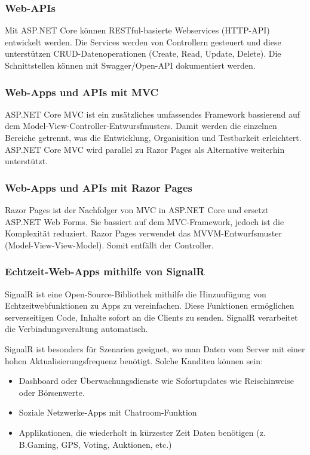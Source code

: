 \subsubsection{Web-APIs}
Mit ASP.NET Core können RESTful-basierte Webservices (HTTP-API) entwickelt werden. Die Services werden von Controllern gesteuert und diese 
unterstützen CRUD-Datenoperationen (Create, Read, Update, Delete).
Die Schnittstellen können mit Swagger/Open-API dokumentiert werden.

\subsubsection{Web-Apps und APIs mit MVC}
ASP.NET Core MVC ist ein zusätzliches umfassendes Framework bassierend auf dem Model-View-Controller-Entwursfmusters. Damit werden 
die einzelnen Bereiche getrennt, was die Entwicklung, Organisition und Testbarkeit erleichtert. 
ASP.NET Core MVC wird parallel zu Razor Pages als Alternative weiterhin unterstützt.

\subsubsection{Web-Apps und APIs mit Razor Pages}
Razor Pages ist der Nachfolger von MVC in ASP.NET Core und ersetzt ASP.NET Web Forms. 
Sie bassiert auf dem MVC-Framework, jedoch ist die Komplexität reduziert. Razor Pages verwendet das 
MVVM-Entwurfsmuster (Model-View-View-Model). Somit entfällt der Controller.


\subsubsection{Echtzeit-Web-Apps mithilfe von SignalR}
SignalR ist eine Open-Source-Bibliothek mithilfe die Hinzuufügung von Echtzeitwebfunktionen zu Apps zu vereinfachen.
Diese Funktionen ermöglichen serverseitigen Code, Inhalte sofort an die Clients zu senden. SignalR verarbeitet die Verbindungsveraltung 
automatisch.

SignalR ist besonders für Szenarien geeignet, wo man Daten vom Server mit einer hohen Aktualisierungsfrequenz benötigt. 
Solche Kanditen können sein:
\begin{itemize}
    \item Dashboard oder Überwachungsdienste wie Sofortupdates wie Reisehinweise oder Börsenwerte.
    \item Soziale Netzwerke-Apps mit Chatroom-Funktion
    \item Applikationen, die wiederholt in kürzester Zeit Daten benötigen (z. B.Gaming, GPS, Voting, Auktionen, etc.)
\end{itemize}


